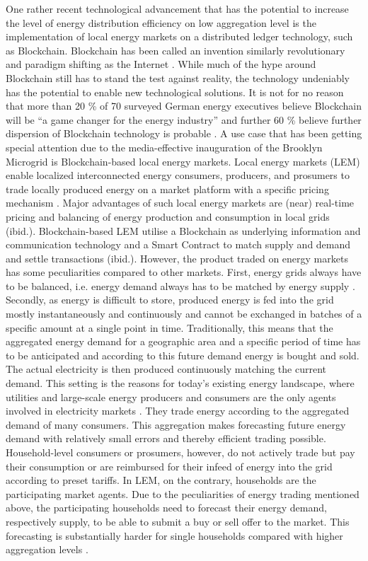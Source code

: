 One rather recent technological advancement that has the potential to increase the level of energy distribution efficiency on low aggregation level is the implementation of local energy markets on a distributed ledger technology, such as Blockchain. Blockchain has been called an invention similarly revolutionary and paradigm shifting as the Internet \citep{Swan:2015}. While much of the hype around Blockchain still has to stand the test against reality, the technology undeniably has the potential to enable new technological solutions. It is not for no reason that more than 20 \% of 70 surveyed German energy executives believe Blockchain will be “a game changer for the energy industry” and further 60 \% believe further dispersion of Blockchain technology is probable \citep{Burger:2016}. A use case that has been getting special attention due to the media-effective inauguration of the Brooklyn Microgrid \citep{newscientist:2016} is Blockchain-based local energy markets. Local energy markets (LEM) enable localized interconnected energy consumers, producers, and prosumers to trade locally produced energy on a market platform with a specific pricing mechanism \citep{Mengelkamp:2018a}. Major advantages of such local energy markets are (near) real-time pricing and balancing of energy production and consumption in local grids (ibid.). Blockchain-based LEM utilise a Blockchain as underlying information and communication technology and a Smart Contract to match supply and demand and settle transactions (ibid.).
However, the product traded on energy markets has some peculiarities compared to other markets. First, energy grids always have to be balanced, i.e. energy demand always has to be matched by energy supply \citep{Weron:2006}. Secondly, as energy is difficult to store, produced energy is fed into the grid mostly instantaneously and continuously and cannot be exchanged in batches of a specific amount at a single point in time. Traditionally, this means that the aggregated energy demand for a geographic area and a specific period of time has to be anticipated and according to this future demand energy is bought and sold. The actual electricity is then produced continuously matching the current demand. This setting is the reasons for today’s existing energy landscape, where utilities and large-scale energy producers and consumers are the only agents involved in electricity markets \citep{Weron:2006}. They trade energy according to the aggregated demand of many consumers. This aggregation makes forecasting future energy demand with relatively small errors \citep{Meer:2018, Wang:2018} and thereby efficient trading possible. Household-level consumers or prosumers, however, do not actively trade but pay their consumption or are reimbursed for their infeed of energy into the grid according to preset tariffs. In LEM, on the contrary, households are the participating market agents. Due to the peculiarities of energy trading mentioned above, the participating households need to forecast their energy demand, respectively supply, to be able to submit a buy or sell offer to the market. This forecasting is substantially harder for single households compared with higher aggregation levels \citep{Wang:2018}.
